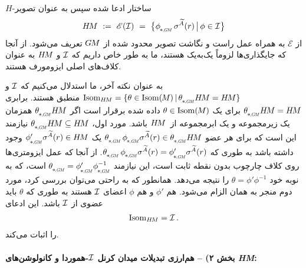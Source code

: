 $H$-ساختار ادعا شده سپس به عنوان تصویر
\begin{align}
	\HM\ :=\ \mathscr{E}(\I)\ =\ \big\{ \dphiGM\, \sigma^{\widetilde{A}}(r) \,\big|\, \phi \in \I \big\}
\end{align}
از $\mathscr{E}$ به همراه عمل راست و نگاشت تصویر محدود شده از $G\mkern-1.4muM$ تعریف می‌شود.
از آنجا که جایگذاری‌ها لزوماً یک‌به‌یک هستند، ما به طور خاص داریم که $\mathcal{I}$ و $H\mkern-2.5muM$ به عنوان کلاف‌های اصلی ایزومورف هستند.


به عنوان نکته آخر، ما استدلال می‌کنیم که $\mathcal{I}$ و $\IsomHM = \{ \theta \in \IsomM \,|\, \dthetaGM \HM = \HM \}$ منطبق هستند.
برابری $\dthetaGM \HM = \HM$ برای یک $\theta \in \operatorname{Isom}(\mkern-1.5mu M \mkern-.5mu)$ داده شده برقرار است اگر $\dthetaGM \HM$ همزمان یک زیرمجموعه و یک ابرمجموعه از~$H\mkern-2.5muM$ باشد.
مورد اول، $\dthetaGM \HM \subseteq \HM$ نیازمند این است که برای هر عضو $\dthetaGM\, \dphiGM \sigma^{\widetilde{A}}(r) \in \dthetaGM \HM$ یک $\dphiGM' \sigma^{\widetilde{A}}(r) \in \HM$ وجود داشته باشد به طوری که $\dthetaGM\, \dphiGM \sigma^{\widetilde{A}}(r) = \dphiGM' \sigma^{\widetilde{A}}(r)$.
از آنجا که عمل ایزومتری‌ها روی کلاف چارچوب بدون نقطه ثابت است، این نیازمند $\dthetaGM = \dphiGM' \dphiGM^{-1}$ است، که به نوبه خود $\theta = \phi' \phi^{-1}$ را نتیجه می‌دهد.
همانطور که به راحتی می‌توان بررسی کرد، مورد دوم منجر به همان الزام می‌شود.
هم $\phi'$ و هم $\phi$ اعضای $\mathcal{I}$ هستند به طوری که $\theta$ باید عضوی از $\mathcal{I}$ باشد.
این ادعای
\begin{align}\label{eq:IsomHM_I}
	\operatorname{Isom}_{H\mkern-2.5muM} = \mathcal{I} \,.
\end{align}
را اثبات می‌کند.














\paragraph{بخش ۲) -- هم‌ارزی تبدیلات میدان کرنل $\mathcal{I}$-هموردا و کانولوشن‌های \textit{HM}:}

